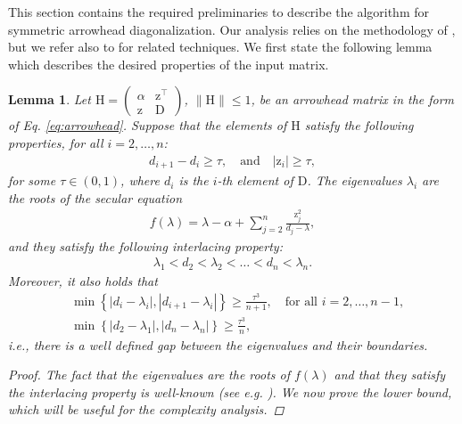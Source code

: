 \documentclass{article}
\newcommand{\labs}{\left|}
\newcommand{\rabs}{\right|}
\newcommand{\lcurly}{\left\{}
\newcommand{\rcurly}{\right\}}
\newtheorem{lemma}{Lemma}[section]
\newcommand\vecz{\boldsymbol{\mathrm{z}}}
\newcommand\matD{\boldsymbol{\mathrm{D}}}
\newcommand\matH{\boldsymbol{\mathrm{H}}}
\begin{document}
This section contains the required preliminaries to describe the algorithm for symmetric arrowhead diagonalization. Our analysis relies on the methodology of \cite{gu1995divide}, but we refer also to \cite{o1990computing,stor2015accurate} for related techniques. We first state the following lemma which describes the desired properties of the input matrix.
\begin{lemma}
\label{lemma:arrowhead_preliminaries}
Let $\matH=\begin{pmatrix}
        \alpha & \vecz^\top \\
        \vecz & \matD
\end{pmatrix}$, $\|\matH\|\leq 1$, be an arrowhead matrix in the form of Eq. \eqref{eq:arrowhead}.
Suppose that the elements of $\matH$ satisfy the following properties, for all $i=2,\ldots,n$:
\begin{align}
    \label{eq:arrowhead_desiderata}
    d_{i+1}-d_i \geq \tau, \quad \text{and} \quad |\vecz_i|\geq \tau,
\end{align}
for some $\tau\in(0,1)$, where $d_i$ is the $i$-th element of $\matD$. The eigenvalues $\lambda_i$ are the roots of the secular equation
\begin{align}
    f(\lambda)=\lambda-\alpha+\sum_{j=2}^n \tfrac{\vecz_j^2}{d_j-\lambda},
    \label{eq:arrowhead_secular_equation}
\end{align}
and they satisfy the following interlacing property:
\begin{align}
    \lambda_1 < d_2 < \lambda_2 < \ldots < d_n < \lambda_n.
    \label{eq:arrowhead_interlacing}
\end{align}
Moreover, it also holds that
\begin{align}
    \label{eq:arrowhead_eigenvalue_boundaries_distance}
    &\min\lcurly
        \labs d_i-\lambda_i \rabs,
        \labs d_{i+1}-\lambda_i \rabs
    \rcurly
    \geq
    \frac{\tau^3}{n+1},\quad \text{for all }i=2,\ldots, n-1,\nonumber
    \\
    &\min\lcurly
        \labs d_2-\lambda_1 \rabs,
        \labs d_n-\lambda_n \rabs
    \rcurly
    \geq
    \frac{\tau^3}{n},
\end{align}
i.e., there is a well defined gap between the eigenvalues and their boundaries.
\begin{proof}
    The fact that the eigenvalues are the roots of $f(\lambda)$ and that they satisfy the interlacing property is well-known (see e.g. \cite{o1990computing}). We now prove the lower bound, which will be useful for the complexity analysis.


\end{proof}
\end{lemma}
\end{document}
